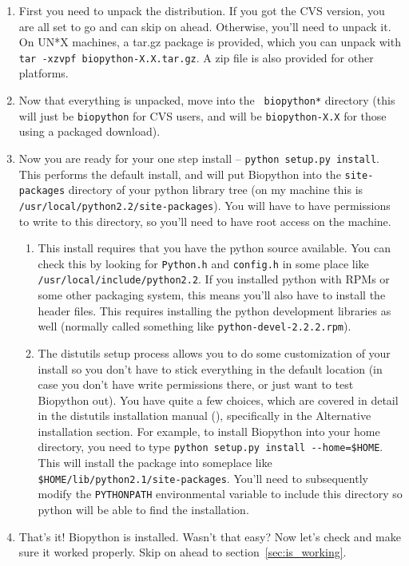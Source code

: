 \documentclass{article}
\begin{document}
\begin{enumerate}

\item First you need to unpack the distribution. If you got the CVS version, you are all set to go and can skip on ahead. Otherwise, you'll need to unpack it. On UN*X machines, a tar.gz package is provided, which you can unpack with \verb|tar -xzvpf biopython-X.X.tar.gz|. A zip file is also provided for other platforms.

\item Now that everything is unpacked, move into the \verb| biopython*| directory (this will just be \verb|biopython| for CVS users, and will be \verb|biopython-X.X| for those using a packaged download). 

\item Now you are ready for your one step install -- \verb|python setup.py install|. This performs the default install, and will put Biopython into the \verb|site-packages| directory of your python library tree (on my machine this is \verb|/usr/local/python2.2/site-packages|). You will have to have permissions to write to this directory, so you'll need to have root access on the machine.

\begin{enumerate}

\item This install requires that you have the python source available. You can check this by looking for \verb|Python.h| and \verb|config.h| in some place like \verb|/usr/local/include/python2.2|. If you installed python with RPMs or 
some other packaging system, this means you'll also have to install the
header files. This requires installing the python development libraries
as well (normally called something like \verb|python-devel-2.2.2.rpm|).

\item The distutils setup process allows you to do some customization of your install so you don't have to stick everything in the default location (in case you don't have write permissions there, or just want to test Biopython out). You have quite a few choices, which are covered in detail in the distutils installation manual (), specifically in the Alternative installation section. For example, to install Biopython into your home directory, you need to type \verb|python setup.py install --home=$HOME|. This will install the package into someplace like \verb|$HOME/lib/python2.1/site-packages|. You'll need to subsequently modify the \verb|PYTHONPATH| environmental variable to include this directory so python will be able to find the installation.

\end{enumerate}

\item That's it! Biopython is installed. Wasn't that easy? Now let's check and make sure it worked properly. Skip on ahead to section~\ref{sec:is_working}.

\end{enumerate}
\end{document}
